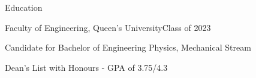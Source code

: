 \documentclass{resume} %
\begin{document}
\begin{rSection}{Education}

\begin{rSubsection}{Faculty of Engineering, Queen's University}{Class of 2023}{}{}
\item Candidate for Bachelor of Engineering Physics, Mechanical Stream
\item Dean's List with Honours - GPA of 3.75/4.3 \\

\end{rSubsection}
\end{rSection}










\end{document}
